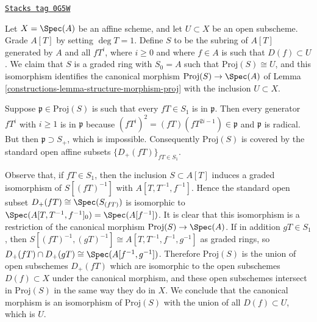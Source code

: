 \begin{example}
\label{constructions-example-open-subset-proj}
\href{https://stacks.math.columbia.edu/tag/0G5W}{\texttt{Stacks tag 0G5W}}

Let $X = \Spec(A)$ be an affine scheme, and let $U \subset X$
be an open subscheme.  Grade $A[T]$ by setting $\deg T = 1$.  Define $S$
to be the subring of $A[T]$ generated by $A$ and all $fT^i$, where $i \ge 0$
and where $f \in A$ is such that $D(f) \subset U$.  We claim that $S$
is a graded ring with $S_0 = A$ such that $\text{Proj}(S) \cong U$,
and this isomorphism identifies the canonical morphism
$\text{Proj}(S) \to \Spec(A)$ of Lemma \ref{constructions-lemma-structure-morphism-proj}
with the inclusion $U \subset X$.

\medskip\noindent
Suppose $\mathfrak p \in \text{Proj}(S)$ is such that every $fT \in S_1$
is in $\mathfrak p$.  Then every generator $fT^i$ with $i \ge 1$
is in $\mathfrak p$ because $(fT^i)^2 = (fT)(fT^{2i-1}) \in \mathfrak p$
and $\mathfrak p$ is radical.  But then $\mathfrak p \supset S_+$, which
is impossible. Consequently $\text{Proj}(S)$ is covered by the standard
open affine subsets $\{D_+(fT)\}_{fT \in S_1}$.

\medskip\noindent
Observe that, if $fT \in S_1$, then the inclusion $S \subset A[T]$
induces a graded isomorphism of $S[(fT)^{-1}]$ with $A[T, T^{-1}, f^{-1}]$.
Hence the standard open subset $D_+(fT) \cong \Spec(S_{(fT)})$
is isomorphic to $\Spec(A[T, T^{-1}, f^{-1}]_0) = \Spec(A[f^{-1}])$.
It is clear that this isomorphism is a restriction of the canonical morphism
$\text{Proj}(S) \to \Spec(A)$.  If in addition $gT \in S_1$, then
$S[(fT)^{-1}, (gT)^{-1}] \cong A[T, T^{-1}, f^{-1}, g^{-1}]$
as graded rings, so $D_+(fT) \cap D_+(gT) \cong \Spec(A[f^{-1}, g^{-1}])$.
Therefore $\text{Proj}(S)$ is the union of open subschemes $D_+(fT)$
which are isomorphic to the open subschemes $D(f) \subset X$
under the canonical morphism, and these open subschemes intersect
in $\text{Proj}(S)$ in the same way they do in $X$.
We conclude that the canonical morphism is an isomorphism of
$\text{Proj}(S)$ with the union of all $D(f) \subset U$, which is $U$.
\end{example}

